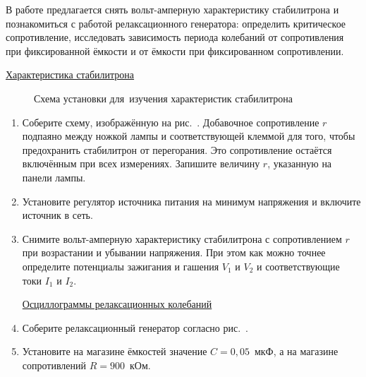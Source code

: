 \begin{lab:task}

В работе предлагается снять вольт-амперную характеристику стабилитрона и познакомиться с работой релаксационного
генератора: определить критическое сопротивление, исследовать зависимость периода колебаний от сопротивления при
фиксированной ёмкости и от ёмкости при фиксированном сопротивлении.

		    \begin{center}
		    \underline{Характеристика стабилитрона}
		    \end{center}

\begin{figure}[h!] 
	\caption{Схема установки для~изучения характеристик стабилитрона}
\end{figure}
	\begin{enumerate}
		\item Соберите схему, изображённую на рис.~. Добавочное сопротивление $r$ подпаяно между ножкой лампы и соответствующей
клеммой для того, чтобы предохранить стабилитрон от перегорания. Это сопротивление остаётся включённым при всех
измерениях. Запишите величину $r$, указанную на панели лампы.

		\item Установите регулятор источника питания на минимум напряжения и включите источник в сеть.

		\item Снимите вольт-амперную характеристику стабилитрона с сопротивлением $r$ при возрастании и убывании напряжения. При
этом как можно точнее определите потенциалы зажигания и гашения $V_1$ и $V_2$ и соответствующие токи $I_1$ и $I_2$.

		    \begin{center}
		    \underline{Осциллограммы релаксационных колебаний}
		    \end{center}

		\item Соберите релаксационный генератор согласно рис.~.

		\item Установите на магазине ёмкостей значение $C=0,05$~мкФ, а на магазине сопротивлений $R=900$~кОм.


\end{enumerate}
\end{lab:task}
